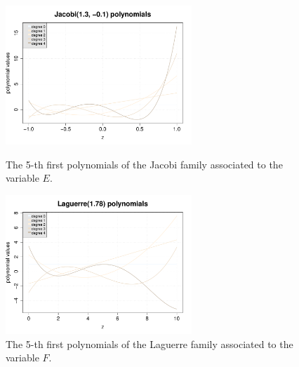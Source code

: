 \documentclass[11pt]{article}
\begin{document}
\begin{figure}[Hhbtp]
  \begin{minipage}{9cm}
    \begin{center}
      \includegraphics[width=7cm]{Figures/PCE_JacobiPolynomials_VariableE.pdf}
      \caption{The 5-th first polynomials of the Jacobi family associated to the variable $E$.}
      \label{PCE_E}
    \end{center}
  \end{minipage}
  \hfill
  \begin{minipage}{9cm}
    \begin{center}
      \includegraphics[width=7cm]{Figures/PCE_LaguerrePolynomials_VariableF.pdf}
      \caption{The 5-th first polynomials of the Laguerre family associated to the variable $F$.}
      \label{PCE_F}
    \end{center}
  \end{minipage}
\end{figure}
\end{document}
